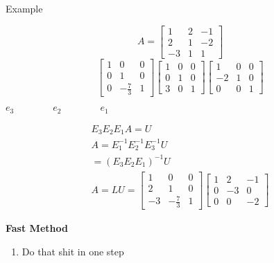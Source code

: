 \documentclass[10pt]{article}
\begin{document}
Example
\begin{minipage}{0.5\linewidth}
    \[
        A = \begin{bmatrix}
            1 & 2 & -1 \\
            2 & 1 & -2 \\
            -3 & 1 & 1
        \end{bmatrix}
    \]
    \[
            \begin{bmatrix}
                1 & 0 & 0 \\
                0 & 1 & 0 \\
                0 & -\frac{7}{3} & 1
            \end{bmatrix}
            \begin{bmatrix}
                1 & 0 & 0 \\
                0 & 1 & 0 \\
                3 & 0 & 1
            \end{bmatrix}
            \begin{bmatrix}
                1 & 0 & 0 \\
                -2 & 1 & 0 \\
                0 & 0 & 1
            \end{bmatrix}
    \]
    \begin{center}  
        \(e_3 \quad\quad\quad\quad e_2 \quad\quad\quad\quad e_1\)
    \end{center}

    \begin{align*}
        E_3 E_2 E_1 A = U \\
        A = E_1^{-1} E_2^{-1} E_3^{-1} U \\
        = (E_3 E_2 E_1)^{-1} U \\
        A = LU = \begin{bmatrix}
            1 & 0 & 0 \\
            2 & 1 & 0 \\
            -3 & -\frac{7}{3} & 1
        \end{bmatrix}
        \begin{bmatrix}
            1 & 2 & -1 \\
            0 & -3 & 0 \\
            0 & 0 & -2
        \end{bmatrix}
    \end{align*}
\end{minipage}

\textbf{Fast Method}
\begin{enumerate}
    \item Do that shit in one step
\end{enumerate}
\end{document}
